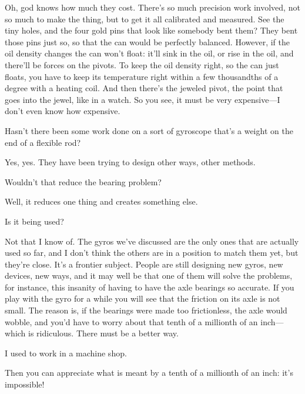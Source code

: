 \documentclass[11pt,oneside]{article}
\begin{document}
Oh, god knows how much they cost. There's so much precision work involved, not so much to make the thing, but to get it all calibrated and measured. See the tiny holes, and the four gold pins that look like somebody bent them? They bent those pins just so, so that the can would be perfectly balanced. However, if the oil density changes the can won't float: it'll sink in the oil, or rise in the oil, and there'll be forces on the pivots. To keep the oil density right, so the can just floats, you have to keep its temperature right within a few thousandths of a degree with a heating coil. And then there's the jeweled pivot, the point that goes into the jewel, like in a watch. So you see, it must be very expensive---I don't even know how expensive.\par

Hasn't there been some work done on a sort of gyroscope that's a weight on the end of a flexible rod?\par

Yes, yes. They have been trying to design other ways, other methods.\par

Wouldn't that reduce the bearing problem?\par

Well, it reduces one thing and creates something else.\par

Is it being used?\par

Not that I know of. The gyros we've discussed are the only ones that are actually used so far, and I don't think the others are in a position to match them yet, but they're close. It's a frontier subject. People are still designing new gyros, new devices, new ways, and it may well be that one of them will solve the problems, for instance, this insanity of having to have the axle bearings so accurate. If you play with the gyro for a while you will see that the friction on its axle is not small. The reason is, if the bearings were made too frictionless, the axle would wobble, and you'd have to worry about that tenth of a millionth of an inch---which is ridiculous. There must be a better way.\par

I used to work in a machine shop.\par

Then you can appreciate what is meant by a tenth of a millionth of an inch: it's impossible!\par
\end{document}

